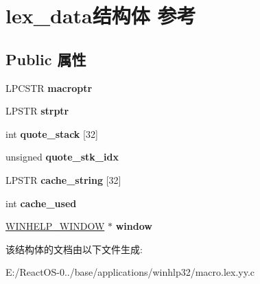 \hypertarget{structlex__data}{}\section{lex\+\_\+data结构体 参考}
\label{structlex__data}
\subsection*{Public 属性}
\begin{DoxyCompactItemize}
\item 
\mbox{\label{structlex__data_a0771b57fa46398ffbd2157eb58820017}} 
L\+P\+C\+S\+TR {\bfseries macroptr}
\item 
\mbox{\label{structlex__data_af5ba88a263b80b54daf3b62ffbdc0205}} 
L\+P\+S\+TR {\bfseries strptr}
\item 
\mbox{\label{structlex__data_a9d9962f3ceb2abcdda84a50a75be33a1}} 
int {\bfseries quote\+\_\+stack} \mbox{[}32\mbox{]}
\item 
\mbox{\label{structlex__data_a546b90e60fd760964ac022b8db7092f0}} 
unsigned {\bfseries quote\+\_\+stk\+\_\+idx}
\item 
\mbox{\label{structlex__data_af8521974a7db564aa1d2c3aa19d78898}} 
L\+P\+S\+TR {\bfseries cache\+\_\+string} \mbox{[}32\mbox{]}
\item 
\mbox{\label{structlex__data_a9a9fdfe65bf56cf634402faa4aa313f4}} 
int {\bfseries cache\+\_\+used}
\item 
\mbox{\label{structlex__data_a783297de3753692056e9f9043754220c}} 
\hyperlink{structtag_win_help}{W\+I\+N\+H\+E\+L\+P\+\_\+\+W\+I\+N\+D\+OW} $\ast$ {\bfseries window}
\end{DoxyCompactItemize}


该结构体的文档由以下文件生成\+:\begin{DoxyCompactItemize}
\item 
E\+:/\+React\+O\+S-\/0../base/applications/winhlp32/macro.\+lex.\+yy.\+c\end{DoxyCompactItemize}

